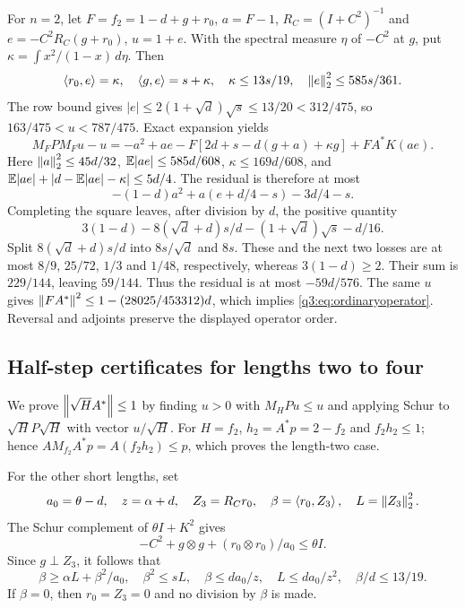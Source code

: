 For $n=2$, let $F=f_2=1-d+g+{r_0}$, $a=F-1$, $R_C=(I+C^2)^{-1}$ and
$e=-C^2R_C(g+{r_0})$, $u=1+e$. With the spectral measure $\eta$ of $-C^2$ at $g$, put $\kappa=\int x^2/(1-x)\,d\eta$. Then
\[
 \left\langle r_0,e\right\rangle=\kappa,\quad\left\langle g,e\right\rangle=s+\kappa,\quad
 \kappa\le13s/19,\quad\left\lVert e\right\rVert_2^2\le585s/361.
\]
The row bound gives $|e|\le2(1+\sqrt d)\sqrt s\le13/20<312/475$, so $163/475<u<787/475$. Exact expansion yields
\[
 M_FP M_Fu-u=-a^2+ae-F[2d+s-d(g+a)+\kappa g]+FA^*K(ae).
\]
Here $\left\lVert a\right\rVert_2^2\le45d/32$, $\mathbb E|ae|\le585d/608$, $\kappa\le169d/608$, and
$\mathbb E|ae|+|d-\mathbb E|ae|-\kappa|\le5d/4$. The residual is therefore at most
\[
 -(1-d)a^2+a(e+d/4-s)-3d/4-s.
\]
Completing the square leaves, after division by $d$, the positive quantity
\[
 3(1-d)-8(\sqrt d+d)s/d-(1+\sqrt d)\sqrt s-d/16.
\]
Split $8(\sqrt d+d)s/d$ into $8s/\sqrt d$ and $8s$. These and the next two losses are at most $8/9$, $25/72$, $1/3$ and $1/48$, respectively, whereas $3(1-d)\ge2$. Their sum is $229/144$, leaving $59/144$. Thus the residual is at most $-59d/576$. The same $u$ gives $\left\lVert FA^*\right\rVert^2\le1-(28025/453312)d$, which implies \eqref{q3:eq:ordinaryoperator}. Reversal and adjoints preserve the displayed operator order.

\subsection{Half-step certificates for lengths two to four}
We prove $\left\lVert\sqrt H A^*\right\rVert\le1$ by finding $u>0$ with $M_HP u\le u$ and applying Schur to $\sqrt H P\sqrt H$ with vector $u/\sqrt H$. For $H=f_2$, $h_2=A^*p=2-f_2$ and $f_2h_2\le1$; hence
$AM_{f_2}A^*p=A(f_2h_2)\le p$, which proves the length-two case.

For the other short lengths, set
\[
 a_0=\theta-d,\quad z=\alpha+d,\quad Z_3=R_C{r_0},\quad
 \beta=\left\langle r_0,Z_3\right\rangle,\quad L=\left\lVert Z_3\right\rVert_2^2.
\]
The Schur complement of $\theta I+K^2$ gives
\[
 -C^2+g\otimes g+({r_0}\otimes {r_0})/a_0\le\theta I.
\]
Since $g\perp Z_3$, it follows that
\begin{equation}\label{q3:eq:centerbounds}
 \beta\ge\alpha L+\beta^2/a_0,\quad
 \beta^2\le sL,\quad
 \beta\le da_0/z,\quad L\le da_0/z^2,\quad\beta/d\le13/19.
\end{equation}
If $\beta=0$, then ${r_0}=Z_3=0$ and no division by $\beta$ is made.


